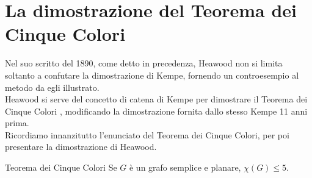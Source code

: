 \documentclass[a4paper,12pt,titlepage]{report}
\begin{document}
    \section{La dimostrazione del Teorema dei Cinque Colori}
    Nel suo scritto del 1890, come detto in precedenza, Heawood non si limita soltanto a confutare la dimostrazione di Kempe, fornendo un controesempio al metodo da egli illustrato.
    \\Heawood si serve del concetto di catena di Kempe per dimostrare il Teorema dei Cinque Colori {\bfseries \cite{Saaty}}, modificando la dimostrazione fornita dallo stesso Kempe 11 anni prima.
    \\Ricordiamo innanzitutto l'enunciato del Teorema dei Cinque Colori, per poi presentare la dimostrazione di Heawood.
    \begin{namedthm*}{Teorema dei Cinque Colori}
    	Se $G$ è un grafo semplice e planare, $\chi(G) \leq 5$.
    \end{namedthm*}
\end{document}
